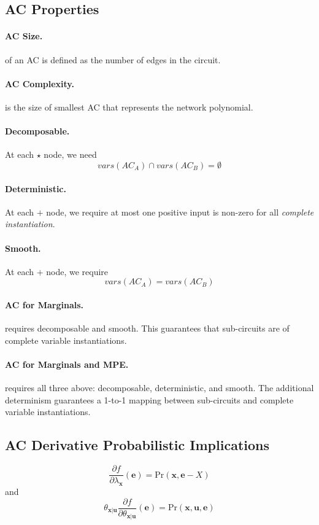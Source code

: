 \documentclass[11pt]{article}
\newcommand{\be}{\mathbf{e}}
\newcommand{\bu}{\mathbf{u}}
\newcommand{\bx}{\mathbf{x}}
\newcommand{\pr}{\mathrm{Pr}}
\begin{document}
\subsection{AC Properties}
\paragraph{AC Size.}
of an AC is defined as the number of edges in the circuit.  
\paragraph{AC Complexity.}
is the size of smallest AC that represents the network polynomial. 

\paragraph{Decomposable.}
At each $\star$ node, we need 
\begin{equation}
	vars(AC_A) \cap vars(AC_B) = \emptyset
\end{equation}

\paragraph{Deterministic.}
At each $+$ node, we require at most one positive input is non-zero for all \textit{complete instantiation}. 

\paragraph{Smooth.}
At each $+$ node, we require 
\begin{equation}
	vars(AC_A) = vars(AC_B)
\end{equation}

\paragraph{AC for Marginals.} requires decomposable and smooth. This guarantees that sub-circuits are of complete variable instantiations. 

\paragraph{AC for Marginals and MPE.} requires all three above: decomposable, deterministic, and smooth. The additional determinism guarantees a 1-to-1 mapping between sub-circuits and complete variable instantiations. 


\subsection{AC Derivative Probabilistic Implications}
\begin{equation}
	\frac{\partial f}{\partial \lambda _\bx} (\be) = \pr( \bx, \be - X) 
\end{equation}
and 
\begin{equation}
	\theta_{\bx | \bu} \frac{\partial f}{\partial \theta_{\bx | \bu}} ( \be) = \pr (\bx, \bu, \be)
\end{equation}
\end{document}
